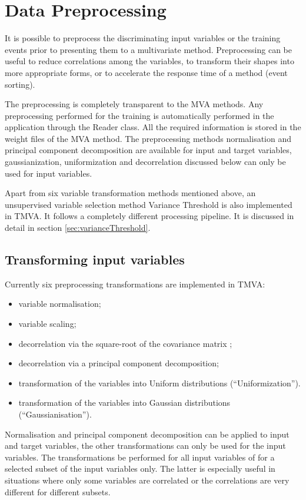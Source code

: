 \section{Data Preprocessing}
\label{sec:dataPreprocessing}

It is possible to preprocess the discriminating input variables or the training events prior 
to presenting them to a multivariate method. Preprocessing can be useful to reduce correlations 
among the variables, to transform their shapes into more appropriate forms, or to accelerate 
the response time of a method (event sorting). 

The preprocessing is completely transparent to 
the MVA methods. Any preprocessing performed for the training is automatically performed in 
the application through the Reader class. All the required information is stored in the 
weight files of the MVA method. The preprocessing methods normalisation and principal component 
decomposition are available for input and target variables, gaussianization, uniformization and decorrelation 
discussed below can only be used for input variables. 

Apart from six variable transformation methods mentioned above, an unsupervised variable selection method Variance Threshold is also implemented in TMVA. It follows a completely different processing pipeline. It is discussed in detail in section \ref{sec:varianceThreshold}. 

\subsection{Transforming input variables}
\label{sec:variableTransform}

Currently six preprocessing  
transformations
are implemented in TMVA:
\begin{itemize}
\item variable normalisation;
\item variable scaling;
\item decorrelation via the square-root of the covariance matrix ;
\item decorrelation via a principal component decomposition;
\item transformation of the variables into Uniform distributions (``Uniformization'').
\item transformation of the variables into Gaussian distributions (``Gaussianisation'').
\end{itemize}
Normalisation and principal component decomposition can be applied to input and target variables, 
the other transformations can only be used for the input variables.  The transformations be performed for all input variables of for a selected subset of the input variables only. The latter is especially useful in situations where only some variables are correlated or the correlations are very different for different subsets.

